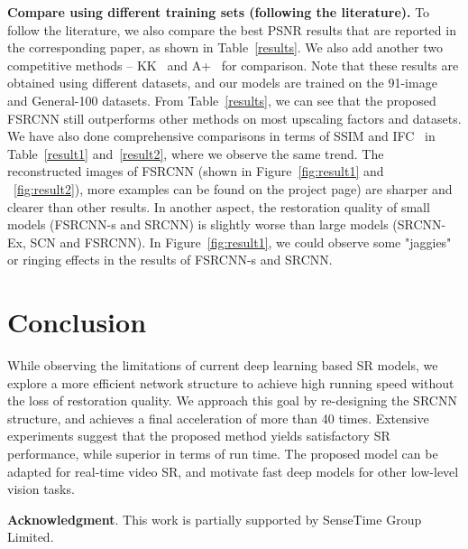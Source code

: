 \documentclass[runningheads]{llncs}
\begin{document}
\noindent
\textbf{Compare using different training sets (following the literature).} To follow the literature, we also compare the best PSNR results that are reported in the corresponding paper, as shown in Table~\ref{results}. We also add another two competitive methods -- KK~\cite{Kim2010} and A+~\cite{Timofte2014} for comparison. Note that these results are obtained using different datasets, and our models are trained on the 91-image and General-100 datasets. From Table~\ref{results}, we can see that the proposed FSRCNN still outperforms other methods on most upscaling factors and datasets. We have also done comprehensive comparisons in terms of SSIM and IFC~\cite{sheikh2005information} in Table~\ref{result1} and~\ref{result2}, where we observe the same trend. The reconstructed images of FSRCNN (shown in Figure~\ref{fig:result1} and ~\ref{fig:result2}), more examples can be found on the project page) are sharper and clearer than other results. In another aspect, the restoration quality of small models (FSRCNN-s and SRCNN) is slightly worse than large models (SRCNN-Ex, SCN and FSRCNN). In Figure~\ref{fig:result1}, we could observe some "jaggies" or ringing effects in the results of FSRCNN-s and SRCNN.



\section{Conclusion}
While observing the limitations of current deep learning based SR models, we explore a more efficient network structure to achieve high running speed without the loss of restoration quality. We approach this goal by re-designing the SRCNN structure, and achieves a final acceleration of more than 40 times.
Extensive experiments suggest that the proposed method yields satisfactory SR performance, while superior in terms of run time. The proposed model can be adapted for real-time video SR, and motivate fast deep models for other low-level vision tasks.

\noindent
\textbf{Acknowledgment}. This work is partially supported by SenseTime Group Limited.
\end{document}
